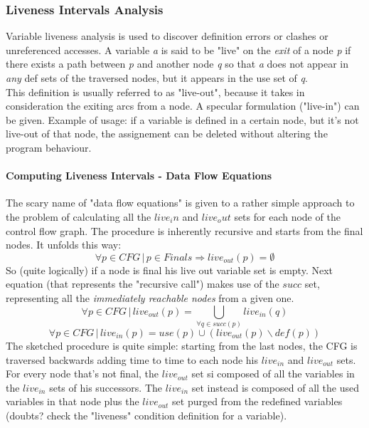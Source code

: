 \documentclass[10pt,a4paper]{article}
\begin{document}
			\subsubsection{Liveness Intervals Analysis}
				Variable liveness analysis is used to discover definition errors or clashes or unreferenced accesses. A variable \emph{a} is said to be "live" on the \emph{exit} of a node \emph{p} if there exists a path between \emph{p} and another node \emph{q} so that \emph{a} does not appear in \emph{any} def sets of the traversed nodes, but it appears in the use set of \emph{q}.\\
				This definition is usually referred to as "live-out", because it takes in consideration the exiting arcs from a node. A specular formulation ("live-in") can be given. Example of usage: if a variable is defined in a certain node, but it's not live-out of that node, the assignement can be deleted without altering the program behaviour.
				
				\paragraph{Computing Liveness Intervals - Data Flow Equations}
					 The scary name of "data flow equations" is given to a rather simple approach to the problem of calculating all the $live_in$ and $live_out$ sets for each node of the control flow graph. The procedure is inherently recursive and starts from the final nodes. It unfolds this way:
					 \begin{equation}
					 	\forall p \in CFG \,\vert\, p \in Finals \Rightarrow live_{out}(p) = \emptyset
					 \end{equation}
					 So (quite logically) if a node is final his live out variable set is empty. Next equation (that represents the "recursive call") makes use of the $succ$ set, representing all the \emph{immediately reachable nodes} from a given one.
					 \begin{equation}
					 	\forall p \in CFG \,\vert\, live_{out}(p) = \bigcup\limits_{\forall q \in succ(p)} live_{in}(q) 
					 \end{equation}
					 \begin{equation}
					 	\forall p \in CFG \,\vert\, live_{in}(p) = use(p) \cup (live_{out}(p) \backslash def(p))
					 \end{equation}
					 The sketched procedure is quite simple: starting from the last nodes, the CFG is traversed backwards adding time to time to each node his $live_{in}$ and $live_{out}$ sets. For every node that's not final, the $live_{out}$ set si composed of all the variables in the $live_{in}$ sets of his successors. The $live_{in}$ set instead is composed of all the used variables in that node plus the $live_{out}$ set purged from the redefined variables (doubts? check the "liveness" condition definition for a variable).
					 
\end{document}
